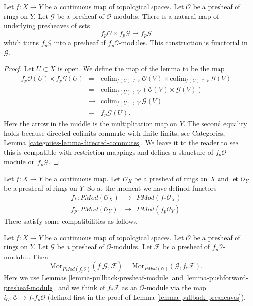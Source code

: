 \begin{lemma}
\label{lemma-pullback-presheaf-module}
Let $f : X \to Y$ be a continuous map of topological spaces.
Let $\mathcal{O}$ be a presheaf of rings on $Y$. Let
$\mathcal{G}$ be a presheaf of $\mathcal{O}$-modules.
There is a natural map of underlying presheaves of sets
$$
f_p\mathcal{O} \times f_p\mathcal{G}
\longrightarrow
f_p\mathcal{G}
$$
which turns $f_p\mathcal{G}$ into a presheaf of $f_p\mathcal{O}$-modules.
This construction is functorial in $\mathcal{G}$.
\end{lemma}

\begin{proof}
Let $U \subset X$ is open. We define the map of the lemma
to be the map
\begin{eqnarray*}
f_p\mathcal{O}(U) \times f_p\mathcal{G}(U)
& = &
\text{colim}_{f(U) \subset V}\ \mathcal{O}(V)
\times 
\text{colim}_{f(U) \subset V}\ \mathcal{G}(V) \\
& = &
\text{colim}_{f(U) \subset V}\ (\mathcal{O}(V)\times \mathcal{G}(V)) \\
& \to &
\text{colim}_{f(U) \subset V}\ \mathcal{G}(V) \\
& = &
f_p\mathcal{G}(U).
\end{eqnarray*}
Here the arrow in the middle is the multiplication map on $Y$.
The second equality holds because directed colimits commute
with finite limits, see
Categories, Lemma \ref{categories-lemma-directed-commutes}.
We leave it to the reader to see this is compatible with
restriction mappings and defines a structure of
$f_p\mathcal{O}$-module on $f_p\mathcal{G}$.
\end{proof}

\noindent
Let $f : X \to Y$ be a continuous map.
Let $\mathcal{O}_X$ be a presheaf of rings on $X$ and
let $\mathcal{O}_Y$ be a presheaf of rings on $Y$.
So at the moment we have defined functors
\begin{eqnarray*}
f_* : \textit{PMod}(\mathcal{O}_X) &
\longrightarrow &
\textit{PMod}(f_*\mathcal{O}_X) \\
f_p : \textit{PMod}(\mathcal{O}_Y) &
\longrightarrow &
\textit{PMod}(f_p\mathcal{O}_Y)
\end{eqnarray*}
These satisfy some compatibilities as follows.

\begin{lemma}
\label{lemma-adjoint-push-pull-presheaves-modules}
Let $f : X \to Y$ be a continuous map of topological spaces.
Let $\mathcal{O}$ be a presheaf of rings on $Y$.
Let $\mathcal{G}$ be a presheaf of $\mathcal{O}$-modules.
Let $\mathcal{F}$ be a presheaf of $f_p\mathcal{O}$-modules.
Then
$$
\text{Mor}_{\textit{PMod}(f_p\mathcal{O})}(f_p\mathcal{G}, \mathcal{F})
=
\text{Mor}_{\textit{PMod}(\mathcal{O})}(\mathcal{G}, f_*\mathcal{F}).
$$
Here we use
Lemmas \ref{lemma-pullback-presheaf-module}
and \ref{lemma-pushforward-presheaf-module}, and we think of
$f_*\mathcal{F}$ as an $\mathcal{O}$-module via the map
$i_\mathcal{O} : \mathcal{O} \to f_*f_p\mathcal{O}$
(defined first in the proof of Lemma \ref{lemma-pullback-presheaves}).
\end{lemma}

